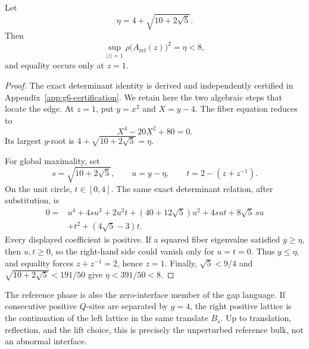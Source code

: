 \begin{proposition}\label{prop:reference-edge}
Let
\[
\eta=4+\sqrt{10+2\sqrt5}.
\]
Then
\[
\sup_{|z|=1}\rho\bigl(A_{\mathrm{ref}}(z)\bigr)^2=\eta<8,
\]
and equality occurs only at \(z=1\).
\end{proposition}

\begin{proof}
The exact determinant identity is derived and independently certified in
Appendix~\ref{app:g6-certification}.  We retain here the two algebraic steps
that locate the edge.  At \(z=1\), put \(y=x^2\) and \(X=y-4\).  The fiber
equation reduces to
\[
X^4-20X^2+80=0.
\]
Its largest \(y\)-root is
\(4+\sqrt{10+2\sqrt5}=\eta\).

For global maximality, set
\[
s=\sqrt{10+2\sqrt5},\qquad u=y-\eta,\qquad
t=2-(z+z^{-1}).
\]
On the unit circle, \(t\in[0,4]\).  The same exact determinant relation,
after substitution, is
\begin{align*}
0={}&u^4+4su^3+2u^2t+(40+12\sqrt5)u^2
+4sut+8\sqrt5\,su\\
&+t^2+(4\sqrt5-3)t.
\end{align*}
Every displayed coefficient is positive.  If a squared fiber eigenvalue
satisfied \(y\geq\eta\), then \(u,t\geq0\), so the right-hand side could
vanish only for \(u=t=0\).  Thus \(y\leq\eta\), and equality forces
\(z+z^{-1}=2\), hence \(z=1\).  Finally,
\(\sqrt5<9/4\) and
\(\sqrt{10+2\sqrt5}<191/50\) give
\(\eta<391/50<8\).
\end{proof}

The reference phase is also the zero-interface member of the gap language.
If consecutive positive \(Q\)-sites are separated by \(g=4\), the right
positive lattice is the continuation of the left lattice in the same
translate \(B_s\).  Up to translation, reflection, and the lift choice,
this is precisely the unperturbed reference bulk, not an abnormal interface.
